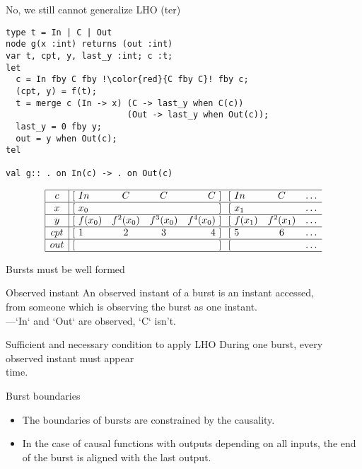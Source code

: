 \documentclass[xcolor=dvipsnames]{beamer}
\def\li{\\ \hline}
\begin{document}
\begin{frame}[fragile]{No, we still cannot generalize LHO (ter)}
\begin{lstlisting}[escapechar=!]
type t = In | C | Out
node g(x :int) returns (out :int)
var t, cpt, y, last_y :int; c :t;
let
  c = In fby C fby !\color{red}{C fby C}! fby c;
  (cpt, y) = f(t);
  t = merge c (In -> x) (C -> last_y when C(c))
                        (Out -> last_y when Out(c));
  last_y = 0 fby y;
  out = y when Out(c);
tel

val g:: . on In(c) -> . on Out(c)
\end{lstlisting}
\[
\begin{array}{|c|@{\ [\ }lccr@{\ ]\ }@{\ [\ }lccr@{\ ]\ }@{\ [\ }lr@{\ ]\ }c} \hline
c & In      & C       & C    & C   & In   & C     &   \ldots\\ \hline
x & x_0     &         &        &       & x_1     &       &   \ldots\\ \hline
y & f(x_0)   & f^2(x_0)  & f^3(x_0) & f^4(x_0)& f(x_1) & f^2(x_1)&   \ldots\\ \hline
cpt & 1 & 2 & 3 & 4 & 5 & 6 &\ldots\li
out &      &         &  & &      &       &   \ldots\\ \hline
\end{array}
\]
\end{frame}

\begin{frame}[fragile]{Bursts must be well formed}
\begin{block}{Observed instant}
An observed instant of a burst is an instant accessed,\\
from someone which is observing the burst as one instant.\\
---`In` and `Out` are observed, `C` isn't.
\end{block}

\begin{block}{Sufficient and necessary condition to apply LHO}
  During one burst, every observed instant must appear\\
  \color{red}{one and only one} time.
\end{block}

\begin{block}{Burst boundaries}
\begin{itemize}
  \item The boundaries of bursts are constrained by the causality.\\
  \item In the case of causal functions with outputs depending on all inputs,
the end of the burst is aligned with the last output.
\end{itemize}
\end{block}
\end{frame}
\end{document}
